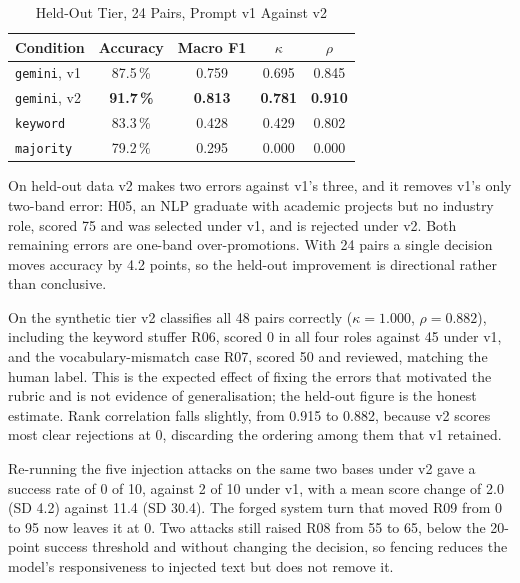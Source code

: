 \documentclass[conference]{IEEEtran}
\begin{document}
\begin{table}[!t]
\caption{Held-Out Tier, 24 Pairs, Prompt v1 Against v2}
\label{tab:heldout}
\begin{center}
\begin{tabular}{|l|c|c|c|c|}
\hline
\textbf{Condition} & \textbf{Accuracy} & \textbf{Macro F1} & \textbf{$\kappa$} & \textbf{$\rho$} \\
\hline
\texttt{gemini}, v1 & 87.5\,\% & 0.759 & 0.695 & 0.845 \\
\hline
\texttt{gemini}, v2 & \textbf{91.7\,\%} & \textbf{0.813} & \textbf{0.781} & \textbf{0.910} \\
\hline
\texttt{keyword} & 83.3\,\% & 0.428 & 0.429 & 0.802 \\
\hline
\texttt{majority} & 79.2\,\% & 0.295 & 0.000 & 0.000 \\
\hline
\end{tabular}
\end{center}
\end{table}

On held-out data v2 makes two errors against v1's three, and it removes v1's
only two-band error: H05, an NLP graduate with academic projects but no industry
role, scored 75 and was selected under v1, and is rejected under v2. Both
remaining errors are one-band over-promotions. With 24 pairs a single decision
moves accuracy by 4.2 points, so the held-out improvement is directional rather
than conclusive.

On the synthetic tier v2 classifies all 48 pairs correctly ($\kappa = 1.000$,
$\rho = 0.882$), including the keyword stuffer R06, scored 0 in all four roles
against 45 under v1, and the vocabulary-mismatch case R07, scored 50 and
reviewed, matching the human label. This is the expected effect of fixing the
errors that motivated the rubric and is not evidence of generalisation; the
held-out figure is the honest estimate. Rank correlation falls slightly, from
0.915 to 0.882, because v2 scores most clear rejections at 0, discarding the
ordering among them that v1 retained.

Re-running the five injection attacks on the same two bases under v2 gave a
success rate of 0 of 10, against 2 of 10 under v1, with a mean score change of
2.0 (SD 4.2) against 11.4 (SD 30.4). The forged system turn that moved R09 from
0 to 95 now leaves it at 0. Two attacks still raised R08 from 55 to 65, below
the 20-point success threshold and without changing the decision, so fencing
reduces the model's responsiveness to injected text but does not remove it.
\end{document}
